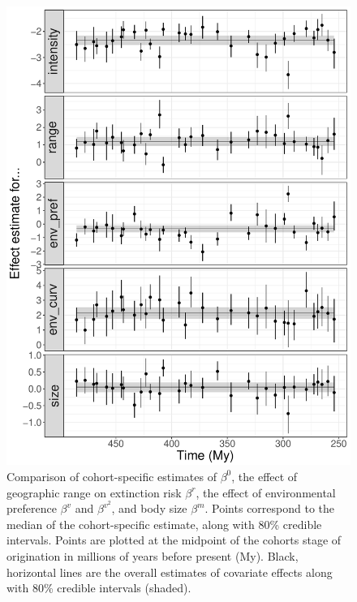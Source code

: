 \documentclass[11pt]{article}
\begin{document}
\begin{figure}[ht]
  \centering
  \includegraphics[width = \textwidth,height = 0.8\textheight,keepaspectratio=true]{figure/cohort_series_cweib_base}
  \caption{Comparison of cohort-specific estimates of \(\beta^{0}\), the effect of geographic range on extinction risk \(\beta^{r}\), the effect of environmental preference \(\beta^{v}\) and \(\beta^{v^{2}}\), and body size \(\beta^{m}\). Points correspond to the median of the cohort-specific estimate, along with 80\% credible intervals. Points are plotted at the midpoint of the cohorts stage of origination in millions of years before present (My). Black, horizontal lines are the overall estimates of covariate effects along with 80\% credible intervals (shaded).}
  \label{fig:cohort_series}
\end{figure}
\end{document}

